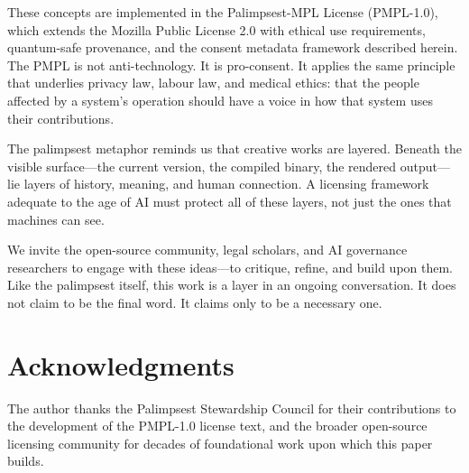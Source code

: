 \documentclass[11pt,twocolumn]{article}
\begin{document}
These concepts are implemented in the Palimpsest-MPL License (PMPL-1.0),
which extends the Mozilla Public License 2.0 with ethical use
requirements, quantum-safe provenance, and the consent metadata
framework described herein. The PMPL is not anti-technology. It is
pro-consent. It applies the same principle that underlies privacy law,
labour law, and medical ethics: that the people affected by a system's
operation should have a voice in how that system uses their contributions.

The palimpsest metaphor reminds us that creative works are layered.
Beneath the visible surface---the current version, the compiled binary,
the rendered output---lie layers of history, meaning, and human
connection. A licensing framework adequate to the age of AI must protect
all of these layers, not just the ones that machines can see.

We invite the open-source community, legal scholars, and AI governance
researchers to engage with these ideas---to critique, refine, and build
upon them. Like the palimpsest itself, this work is a layer in an
ongoing conversation. It does not claim to be the final word. It claims
only to be a necessary one.

\section*{Acknowledgments}

The author thanks the Palimpsest Stewardship Council for their
contributions to the development of the PMPL-1.0 license text, and the
broader open-source licensing community for decades of foundational work
upon which this paper builds.
\end{document}
